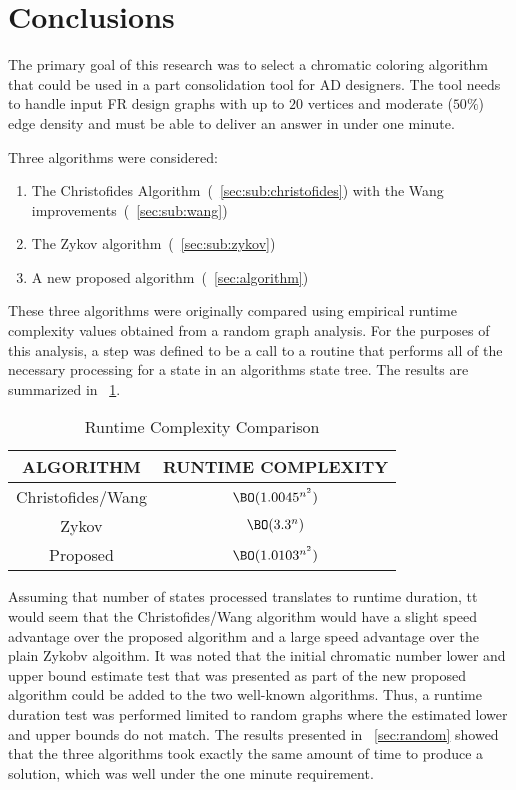 \section{Conclusions}\label{sec:conclusions}

The primary goal of this research was to select a chromatic coloring algorithm that could be used in a part
consolidation tool for AD designers.  The tool needs to handle input FR design graphs with up to \(20\)
vertices and moderate (\(50\%\)) edge density and must be able to deliver an answer in under one minute.

Three algorithms were considered:
\begin{enumerate}
\item The Christofides Algorithm~(\sectionname~\ref{sec:sub:christofides}) with the
  Wang improvements~(\sectionname~\ref{sec:sub:wang})
\item The Zykov algorithm~(\sectionname~\ref{sec:sub:zykov})
\item A new proposed algorithm~(\sectionname~\ref{sec:algorithm})
\end{enumerate}

These three algorithms were originally compared using empirical runtime complexity values obtained from a random
graph analysis.  For the purposes of this analysis, a step was defined to be a call to a routine that performs all
of the necessary processing for a state in an algorithms state tree.  The results are summarized in
\tablename~\ref{tab:rtresults}.

\begin{table}[H]
  \centering
  \caption{Runtime Complexity Comparison}
  \label{tab:rtresults}
  \begin{tabular}{|c|c|}
    \hline
    ALGORITHM & RUNTIME COMPLEXITY \\
    \hline
    Christofides/Wang & \(\BO(1.0045^{n^2})\) \\
    \hline
    Zykov & \(\BO(3.3^n)\) \\
    \hline
    Proposed & \(\BO(1.0103^{n^2})\) \\
    \hline
  \end{tabular}
\end{table}

Assuming that number of states processed translates to runtime duration, tt would seem that the Christofides/Wang
algorithm would have a slight speed advantage over the proposed algorithm and a large speed advantage over the
plain Zykobv algoithm.  It was noted that the initial chromatic number lower and upper bound estimate test that was
presented as part of the new proposed algorithm could be added to the two well-known algorithms.  Thus, a runtime
duration test was performed limited to random graphs where the estimated lower and upper bounds do not match.  The
results presented in \sectionname~\ref{sec:random} showed that the three algorithms took exactly the same amount of
time to produce a solution, which was well under the one minute requirement.


